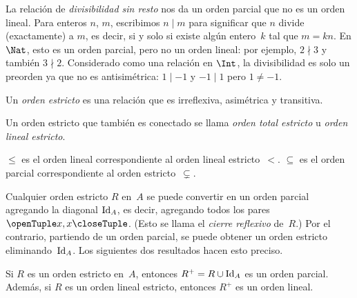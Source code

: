 \documentclass[../../../include/open-logic-section]{subfiles}
\begin{document}
\begin{ex}
La relación de \emph{divisibilidad sin resto} nos da un orden parcial que no es un orden lineal. Para enteros $n$, $m$, escribimos $n\mid m$ para significar que $n$ divide (exactamente) a $m$, es decir, si y solo si existe algún entero~$k$ tal que $m=kn$. En $\Nat$, esto es un orden parcial, pero no un orden lineal: por ejemplo, $2\nmid3$ y también $3\nmid2$. Considerado como una relación en $\Int$, la divisibilidad es solo un preorden ya que no es antisimétrica: $1\mid-1$ y $-1\mid1$ pero $1\neq-1$.
\end{ex}

\begin{defn}
Un \emph{orden estricto} es una relación que es irreflexiva, asimétrica y transitiva.
\end{defn}

\begin{defn}
Un orden estricto que también es conectado se llama \emph{orden total estricto} u \emph{orden lineal estricto}.
\end{defn}

\begin{ex}
$\le$ es el orden lineal correspondiente al orden lineal estricto~$<$. $\subseteq$ es el orden parcial correspondiente al orden estricto~$\subsetneq$.
\end{ex}

Cualquier orden estricto $R$ en~$A$ se puede convertir en un orden parcial agregando la diagonal $\mathord{\mathrm{Id}_{A}}$, es decir, agregando todos los pares~$\tuple{x, x}$. (Esto se llama el \emph{cierre reflexivo} de~$R$.) Por el contrario, partiendo de un orden parcial, se puede obtener un orden estricto eliminando~$\mathord{\mathrm{Id}_{A}}$. Los siguientes dos resultados hacen esto preciso.

\begin{prop}
Si $R$ es un orden estricto en~$A$, entonces $R^+ = R \cup \mathord{\mathrm{Id}_{A}}$ es un orden parcial. Además, si $R$ es un orden lineal estricto, entonces $R^+$ es un orden lineal.
\end{prop}
\end{document}
